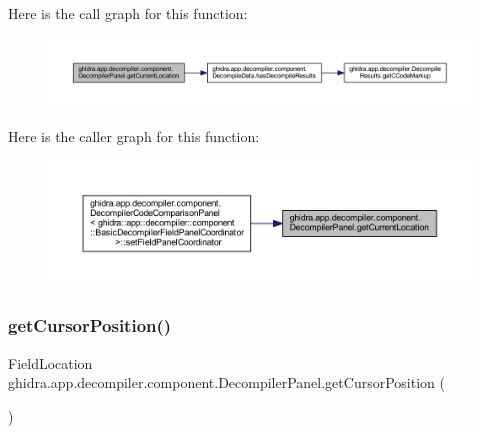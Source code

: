 Here is the call graph for this function\+:
\nopagebreak
\begin{figure}[H]
\begin{center}
\leavevmode
\includegraphics[width=350pt]{classghidra_1_1app_1_1decompiler_1_1component_1_1_decompiler_panel_a090d6e48e23de12508c47d06c6bad425_cgraph}
\end{center}
\end{figure}
Here is the caller graph for this function\+:
\nopagebreak
\begin{figure}[H]
\begin{center}
\leavevmode
\includegraphics[width=350pt]{classghidra_1_1app_1_1decompiler_1_1component_1_1_decompiler_panel_a090d6e48e23de12508c47d06c6bad425_icgraph}
\end{center}
\end{figure}
\mbox{\label{classghidra_1_1app_1_1decompiler_1_1component_1_1_decompiler_panel_ad986829e7678aec3ef2f493d389f7ac1}} 
\subsubsection{\texorpdfstring{getCursorPosition()}{getCursorPosition()}}
{\footnotesize\ttfamily Field\+Location ghidra.\+app.\+decompiler.\+component.\+Decompiler\+Panel.\+get\+Cursor\+Position (\begin{DoxyParamCaption}{ }\end{DoxyParamCaption})\hspace{0.3cm}{\ttfamily [inline]}}



